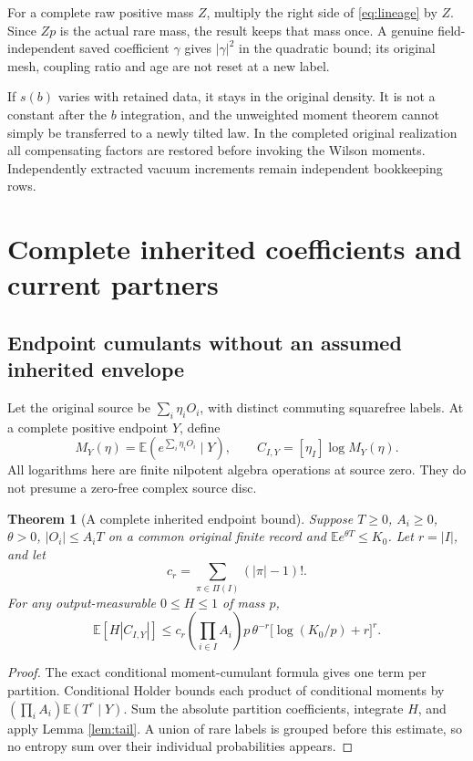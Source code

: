 \documentclass[11pt,letterpaper]{article}
\newtheorem{theorem}{Theorem}[section]
\theoremstyle{remark}\newtheorem{remark}[theorem]{Remark}
\newcommand{\E}{\mathbb E}
\begin{document}
For a complete raw positive mass \(Z\), multiply the right side of \eqref{eq:lineage} by \(Z\). Since \(Zp\) is the actual rare mass, the result keeps that mass once. A genuine field-independent saved coefficient \(\gamma\) gives \(|\gamma|^2\) in the quadratic bound; its original mesh, coupling ratio and age are not reset at a new label.

If \(s(b)\) varies with retained data, it stays in the original density. It is not a constant after the \(b\) integration, and the unweighted moment theorem cannot simply be transferred to a newly tilted law. In the completed original realization all compensating factors are restored before invoking the Wilson moments. Independently extracted vacuum increments remain independent bookkeeping rows.

\section{Complete inherited coefficients and current partners}

\subsection{Endpoint cumulants without an assumed inherited envelope}

Let the original source be \(\sum_i\eta_iO_i\), with distinct commuting squarefree labels. At a complete positive endpoint \(Y\), define
\[
 M_Y(\eta)=\E\!\left(e^{\sum_i\eta_iO_i}\mid Y\right),\qquad
 C_{I,Y}=[\eta_I]\log M_Y(\eta).
\]
All logarithms here are finite nilpotent algebra operations at source zero. They do not presume a zero-free complex source disc.

\begin{theorem}[A complete inherited endpoint bound]\label{thm:cumulant}
Suppose \(T\ge0\), \(A_i\ge0\), \(\theta>0\), \(|O_i|\le A_iT\) on a common original finite record and
\(\E e^{\theta T}\le K_0\). Let \(r=|I|\), and let
\[
 c_r=\sum_{\pi\in\Pi(I)}(|\pi|-1)!.
\]
For any output-measurable \(0\le H\le1\) of mass \(p\),
\begin{equation}\label{eq:cumulant}
 \boxed{\quad
 \E[H|C_{I,Y}|]\le
 c_r\left(\prod_{i\in I}A_i\right)
 p\,\theta^{-r}\bigl[\log(K_0/p)+r\bigr]^r.
 \quad}
\end{equation}
\end{theorem}
\begin{proof}
The exact conditional moment-cumulant formula gives one term per partition. Conditional Holder bounds each product of conditional moments by
\((\prod_iA_i)\E(T^r\mid Y)\). Sum the absolute partition coefficients, integrate \(H\), and apply Lemma \ref{lem:tail}. A union of rare labels is grouped before this estimate, so no entropy sum over their individual probabilities appears.
\end{proof}
\end{document}
